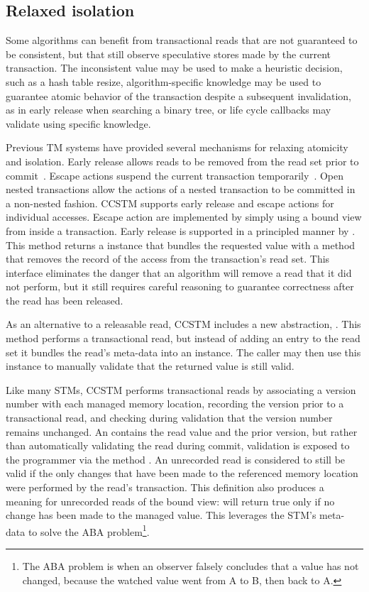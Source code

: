 
\subsection{Relaxed isolation}
\label{sec:unrecordedread}

Some algorithms can benefit from transactional reads that are not guaranteed to
be consistent, but
that still observe speculative stores made by the current transaction.
The inconsistent value may be used to make a heuristic decision, such as a
hash table resize, algorithm-specific knowledge may be used to guarantee
atomic behavior of the transaction despite a subsequent invalidation,
as in early release when searching a binary tree, or life cycle callbacks
may validate using specific knowledge.

Previous TM systems have provided several mechanisms for relaxing
atomicity and isolation.  Early release allows reads to be removed
from the read set prior to commit~\cite{HerlihyLMS03}.  Escape actions
suspend the current transaction temporarily~\cite{harris04exceptions}.
Open nested transactions allow the actions of a nested transaction to
be committed in a non-nested fashion.  CCSTM supports early release
and escape actions for individual accesses.  Escape action are
implemented by simply using a  bound view from inside
a transaction.  Early release is supported in a principled manner
by .  This method returns a
 instance that bundles the requested value with
a method that removes the record of the access from the transaction's
read set.  This interface eliminates the danger that an algorithm will
remove a read that it did not perform, but it still requires careful
reasoning to guarantee correctness after the read has been released.

As an alternative to a releasable read, CCSTM includes a new
abstraction, .  This method performs a
transactional read, but instead of adding an entry to the read set it
bundles the read's meta-data into an  instance.
The caller may then use this instance to manually validate that the
returned value is still valid.

Like many STMs, CCSTM performs transactional reads by associating a
version number with each managed memory location, recording the version
prior to a transactional read, and checking during validation that the
version number remains unchanged.  An  contains the
read value and the prior version, but rather than automatically validating
the read during commit, validation is exposed to the programmer via the
method .  An unrecorded read is considered to still be
valid if the only changes that have been made to the referenced memory
location were performed by the read's transaction.  This definition also
produces a meaning for unrecorded reads of the  bound view:
 will return true only if no change has been made to the
managed value.  This leverages the STM's meta-data to solve
the ABA problem\footnote{The ABA problem is when an observer falsely
concludes that a value has not changed, because the watched value went
from A to B, then back to A.}.

